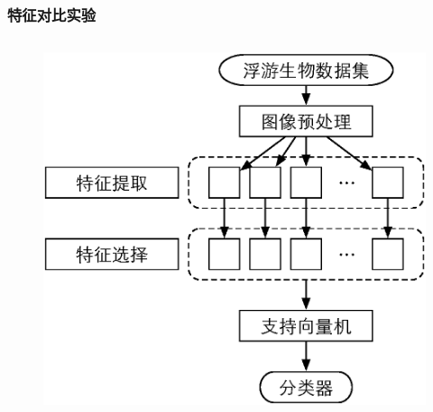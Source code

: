 \documentclass[notheorems,mathserif,table,compress]{beamer}  %
\begin{document}
\begin{frame}
\frametitle{特征对比实验}
\begin{columns}
\begin{column}{0.4\linewidth}
\begin{figure}
\includegraphics[width=0.85\linewidth]{shiyan2}
\end{figure}
\end{column}


\end{columns}
\end{frame}
\end{document}
